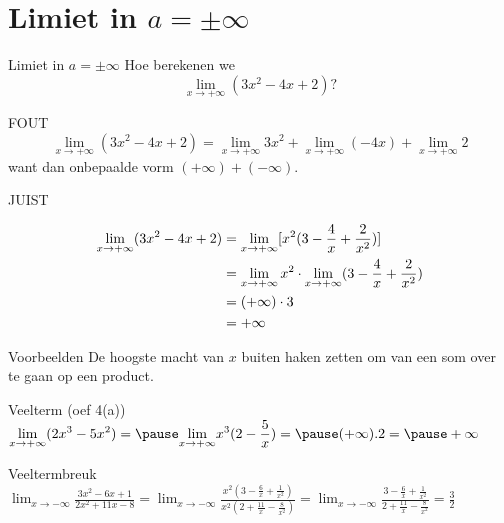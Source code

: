 \documentclass{beamer}
\begin{document}
\section{Limiet in $a = \pm \infty$}
\begin{frame}{Limiet in $a = \pm \infty$}
Hoe berekenen we
$$\lim_{x \rightarrow + \infty} (3x^2 - 4x + 2) ?$$
\begin{block}{FOUT}
$$\lim_{x \rightarrow + \infty} (3x^2 - 4x + 2) = \lim_{x \rightarrow + \infty}
3x^2 + \lim_{x \rightarrow + \infty} (-4x) + \lim_{x \rightarrow +
\infty} 2$$
want dan  onbepaalde vorm $(+ \infty) + (-\infty)$.
\end{block}
\end{frame}
\begin{frame}
\begin{block}{JUIST}

\[\aligned
\lim_{x \rightarrow + \infty} (3x^2 - 4x + 2) & = \lim_{x
\rightarrow + \infty}
[x^2 (3 - \frac{4}{x} + \frac{2}{x^2})] \\
& = \lim_{x \rightarrow + \infty} x^2 \cdot \lim_{x \rightarrow +
\infty} (3 -
\frac{4}{x} + \frac {2}{x^2}) \\
& = (+ \infty) \cdot 3 \\
& = + \infty
\endaligned
\]
\end{block}

\end{frame}
\begin{frame}{Voorbeelden}
De hoogste macht van $x$ buiten haken zetten om van een som over te gaan op een product.
\begin{exampleblock}{Veelterm (oef 4(a))}
$\displaystyle{\lim_{x \rightarrow + \infty}} (2x^3 - 5x^2)= \pause \displaystyle{\lim_{x \rightarrow + \infty}} x^3 (2 - \frac{5}{x})= \pause (+ \infty) . 2 = \pause + \infty$
\end{exampleblock}
\pause
\begin{exampleblock}{Veeltermbreuk}
$\displaystyle{\lim_{x \rightarrow - \infty}} \frac{3x^2 - 6x
+ 1}{2x^2 + 11x - 8}
= \displaystyle{\lim_{x \rightarrow - \infty}} \frac{x^2 (3- \frac{6}{x}
+ \frac{1}{x^2})}{x^2 (2 + \frac{11}{x} - \frac{8}{x^2})}
= \displaystyle{\lim_{x \rightarrow - \infty}} \frac{3- \frac{6}{x}
+ \frac{1}{x^2}}{2 + \frac{11}{x} - \frac{8}{x^2}}
=\frac{3}{2}$

\end{exampleblock}
\end{frame}
\end{document}
